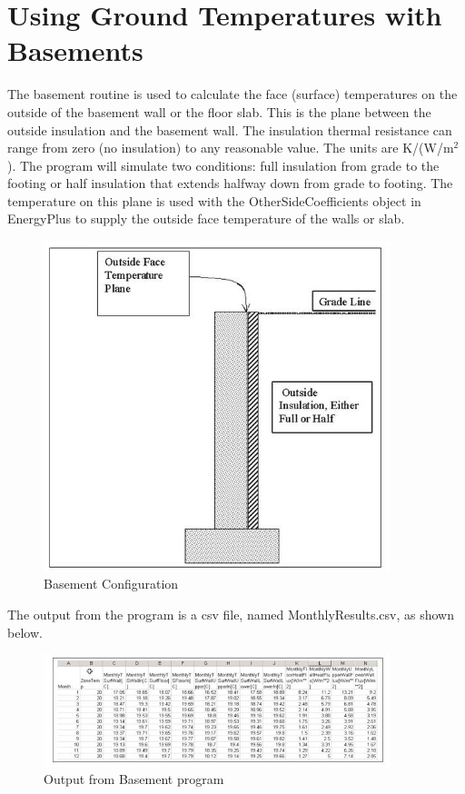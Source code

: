 \section{Using Ground Temperatures with Basements}\label{using-ground-temperatures-with-basements}

The basement routine is used to calculate the face (surface) temperatures on the outside of the basement wall or the floor slab. This is the plane between the outside insulation and the basement wall. The insulation thermal resistance can range from zero (no insulation) to any reasonable value. The units are K/(W/m\(^{2}\)). The program will simulate two conditions: full insulation from grade to the footing or half insulation that extends halfway down from grade to footing. The temperature on this plane is used with the OtherSideCoefficients object in EnergyPlus to supply the outside face temperature of the walls or slab.

\begin{figure}[hbtp] %
\centering
\includegraphics[width=0.9\textwidth, height=0.9\textheight, keepaspectratio=true]{media/image020.jpg}
\caption{Basement Configuration \protect \label{fig:basement-configuration}}
\end{figure}

The output from the program is a csv file, named MonthlyResults.csv, as shown below.

\begin{figure}[hbtp] %
\centering
\includegraphics[width=0.9\textwidth, height=0.9\textheight, keepaspectratio=true]{media/image021.jpg}
\caption{Output from Basement program \protect \label{fig:output-from-basement-program}}
\end{figure}

